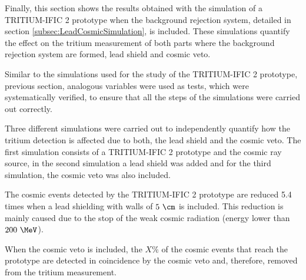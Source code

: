 Finally, this section shows the results obtained with the simulation of a TRITIUM-IFIC 2 prototype when the background rejection system, detailed in section \ref{subsec:LeadCosmicSimulation}, is included. These simulations quantify the effect on the tritium measurement of both parts where the background rejection system are formed, lead shield and cosmic veto.

Similar to the simulations used for the study of the TRITIUM-IFIC 2 prototype, previous section, analogous variables were used as tests, which were systematically verified, to ensure that all the steps of the simulations were carried out correctly.

Three different simulations were carried out to independently quantify how the tritium detection is affected due to both, the lead shield and the cosmic veto. The first simulation consists of a TRITIUM-IFIC 2 prototype and the cosmic ray source, in the second simulation a lead shield was added and for the third simulation, the cosmic veto was also included.

The cosmic events detected by the TRITIUM-IFIC 2 prototype are reduced 5.4 times when a lead shielding with walls of $5~\cm$ is included. This reduction is mainly caused due to the stop of the weak cosmic radiation (energy lower than $200~\MeV$).%

When the cosmic veto is included, the $X\%$ of the cosmic events that reach the prototype are detected in coincidence by the cosmic veto and, therefore, removed from the tritium measurement.
